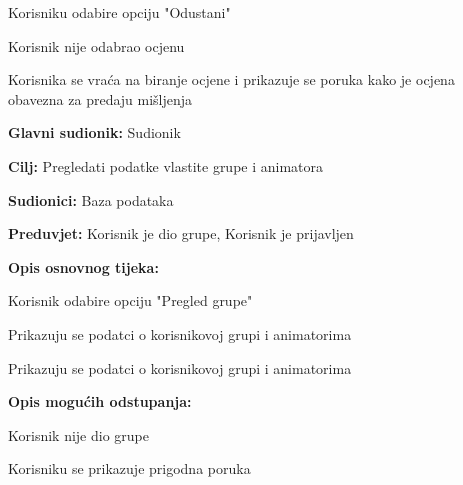 \begin{packed_item}
\begin{packed_item}
\begin{packed_enum}
								\item Korisniku odabire opciju "Odustani"

							\end{packed_enum}
							\item[4.a] Korisnik nije odabrao ocjenu
							\item[] \begin{packed_enum}
								
								\item Korisnika se vraća na biranje ocjene i prikazuje se poruka kako je ocjena obavezna za predaju mišljenja
								
							\end{packed_enum}
						\end{packed_item}
					\end{packed_item}
					
					\noindent {}
					\begin{packed_item}
						
						\item \textbf{Glavni sudionik: }Sudionik
						\item  \textbf{Cilj:} Pregledati podatke vlastite grupe i animatora
						\item  \textbf{Sudionici:} Baza podataka
						\item  \textbf{Preduvjet:} Korisnik je dio grupe, Korisnik je prijavljen
						\item  \textbf{Opis osnovnog tijeka:}
						
						\item[] \begin{packed_enum}
							
							\item Korisnik odabire opciju "Pregled grupe"
							\item Prikazuju se podatci o korisnikovoj grupi i animatorima
							\item Prikazuju se podatci o korisnikovoj grupi i animatorima
						\end{packed_enum}
						
						\item  \textbf{Opis mogućih odstupanja:}
						
						\item[] \begin{packed_item}
							
							\item[2.a] Korisnik nije dio grupe
							\item[] \begin{packed_enum}
								
								\item Korisniku se prikazuje prigodna poruka
								
							\end{packed_enum}
							
						\end{packed_item}
					\end{packed_item}
				
